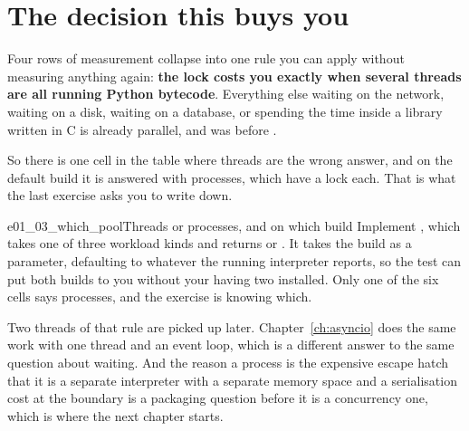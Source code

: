 \section{The decision this buys you}
\label{sec:ch01-decision}

\noindent
Four rows of measurement collapse into one rule you can apply without
measuring anything again: \textbf{the lock costs you exactly when several
threads are all running Python bytecode}. Everything else \dash{} waiting on
the network, waiting on a disk, waiting on a database, or spending the time
inside a library written in C \dash{} is already parallel, and was before
\pyver{}.

So there is one cell in the table where threads are the wrong answer, and on
the default build it is answered with processes, which have a lock each.
That is what the last exercise asks you to write down.

\begin{exercise}{e01_03_which_pool}{Threads or processes, and on which build}
Implement , which takes one of three workload kinds and
returns  or . It takes the build as a
parameter, defaulting to whatever the running interpreter reports, so the
test can put both builds to you without your having two installed. Only one
of the six cells says processes, and the exercise is knowing which.
\end{exercise}

\noindent
Two threads of that rule are picked up later. Chapter~\ref{ch:asyncio} does
the same work with one thread and an event loop, which is a different answer
to the same question about waiting. And the reason a process is the
expensive escape hatch \dash{} that it is a separate interpreter with a
separate memory space and a serialisation cost at the boundary \dash{} is a
packaging question before it is a concurrency one, which is where the next
chapter starts.
